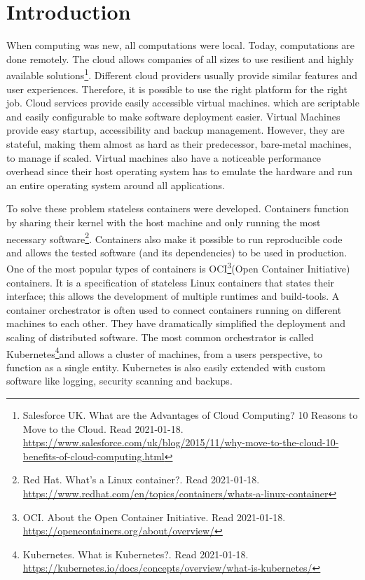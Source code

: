 \def\cloudperks{\footnote{Salesforce UK. What are the Advantages of Cloud Computing? 10 Reasons to Move to the Cloud. Read 2021-01-18. \url{https://www.salesforce.com/uk/blog/2015/11/why-move-to-the-cloud-10-benefits-of-cloud-computing.html}}}
\def\cloudhistory{\footnote{IBM Cloud Team. IBM. A Brief History of Cloud Computing. Read 2021-01-18. \url{https://www.ibm.com/cloud/blog/cloud-computing-history}}}
\def\rhcontainers{\footnote{Red Hat. What's a Linux container?. Read 2021-01-18. \url{https://www.redhat.com/en/topics/containers/whats-a-linux-container}}}
\def\ocicontainers{\footnote{OCI. About the Open Container Initiative. Read 2021-01-18. \url{https://opencontainers.org/about/overview/}}}
\def\whatkubernetes{\footnote{Kubernetes. What is Kubernetes?. Read 2021-01-18. \url{https://kubernetes.io/docs/concepts/overview/what-is-kubernetes/}}}

\chapter{Introduction}
When computing was new, all computations were local. Today, computations are done remotely. The cloud allows companies of all sizes to use resilient and highly available solutions\cloudperks. Different cloud providers usually provide similar features and user experiences. Therefore, it is possible to use the right platform for the right job. Cloud services provide easily accessible virtual machines. which are scriptable and easily configurable to make software deployment easier. Virtual Machines provide easy startup, accessibility and backup management. However, they are stateful, making them almost as hard as their predecessor, bare-metal machines, to manage if scaled. Virtual machines also have a noticeable performance overhead since their host operating system has to emulate the hardware and run an entire operating system around all applications.

To solve these problem stateless containers were developed. Containers function by sharing their kernel with the host machine and only running the most necessary software\rhcontainers. Containers also make it possible to run reproducible code and allows the tested software (and its dependencies) to be used in production. One of the most popular types of containers is OCI\ocicontainers (Open Container Initiative) containers. It is a specification of stateless Linux containers that states their interface; this allows the development of multiple runtimes and build-tools. A container orchestrator is often used to connect containers running on different machines to each other. They have dramatically simplified the deployment and scaling of distributed software. The most common orchestrator is called Kubernetes\whatkubernetes and allows a cluster of machines, from a users perspective, to function as a single entity. Kubernetes is also easily extended with custom software like logging, security scanning and backups.  

